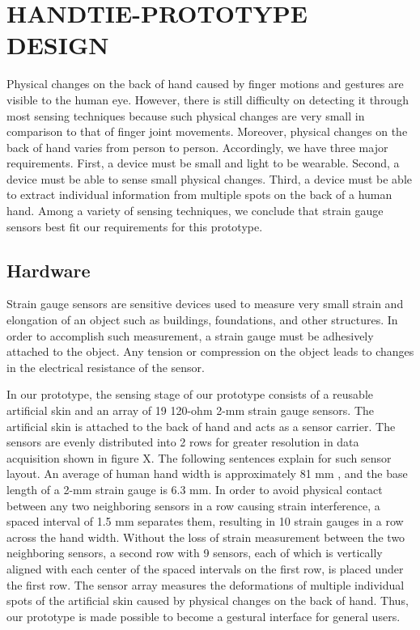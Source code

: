 \documentclass{sigchi}
\begin{document}
\section{HANDTIE-PROTOTYPE DESIGN}

Physical changes on the back of hand caused by finger motions and gestures are visible to the human eye. However, there is still difficulty on detecting it through most sensing techniques because such physical changes are very small in comparison to that of finger joint movements. Moreover, physical changes on the back of hand varies from person to person. Accordingly, we have three major requirements. First, a device must be small and light to be wearable. Second, a device must be able to sense small physical changes. Third, a device must be able to extract individual information from multiple spots on the back of a human hand. Among a variety of sensing techniques, we conclude that strain gauge sensors best fit our requirements for this prototype.

\subsection{Hardware} 
Strain gauge sensors are sensitive devices used to measure very small strain and elongation of an object such as buildings, foundations, and other structures. In order to accomplish such measurement, a strain gauge must be adhesively attached to the object. Any tension or compression on the object leads to changes in the electrical resistance of the sensor.



In our prototype, the sensing stage of our prototype consists of a reusable artificial skin and an array of 19 120-ohm 2-mm strain gauge sensors. The artificial skin is attached to the back of hand and acts as a sensor carrier. The sensors are evenly distributed into 2 rows for greater resolution in data acquisition shown in figure X. The following sentences explain for such sensor layout. An average of human hand width is approximately 81 mm \cite{Kulaksiz2002257}, and the base length of a 2-mm strain gauge is 6.3 mm. In order to avoid physical contact between any two neighboring sensors in a row causing strain interference, a spaced interval of 1.5 mm separates them, resulting in 10 strain gauges in a row across the hand width. Without the loss of strain measurement between the two neighboring sensors, a second row with 9 sensors, each of which is vertically aligned with each center of the spaced intervals on the first row, is placed under the first row. The sensor array measures the deformations of multiple individual spots of the artificial skin caused by physical changes on the back of hand. Thus, our prototype is made possible to become a gestural interface for general users.
\end{document}
